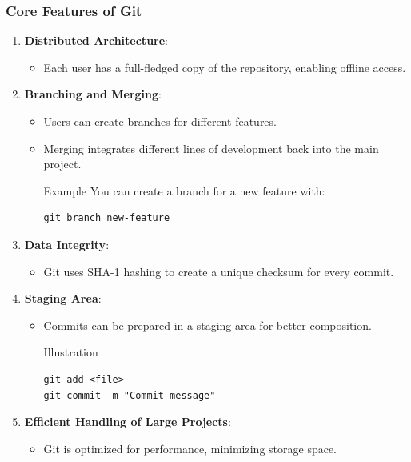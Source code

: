 \documentclass{beamer}
\begin{document}
\begin{frame}[fragile]
    \frametitle{Core Features of Git}
    \begin{enumerate}
        \item \textbf{Distributed Architecture}:
        \begin{itemize}
            \item Each user has a full-fledged copy of the repository, enabling offline access.
        \end{itemize}

        \item \textbf{Branching and Merging}:
        \begin{itemize}
            \item Users can create branches for different features.
            \item Merging integrates different lines of development back into the main project.
            \begin{block}{Example}
                You can create a branch for a new feature with:
                \begin{lstlisting}
git branch new-feature
                \end{lstlisting}
            \end{block}
        \end{itemize}

        \item \textbf{Data Integrity}:
        \begin{itemize}
            \item Git uses SHA-1 hashing to create a unique checksum for every commit.
        \end{itemize}

        \item \textbf{Staging Area}:
        \begin{itemize}
            \item Commits can be prepared in a staging area for better composition.
            \begin{block}{Illustration}
                \begin{lstlisting}
git add <file>
git commit -m "Commit message"
                \end{lstlisting}
            \end{block}
        \end{itemize}

        \item \textbf{Efficient Handling of Large Projects}:
        \begin{itemize}
            \item Git is optimized for performance, minimizing storage space.
        \end{itemize}
    \end{enumerate}
\end{frame}
\end{document}
